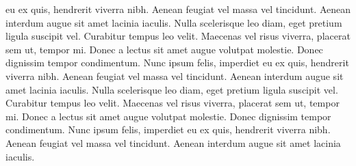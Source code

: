 \documentclass{article}
\begin{document}
eu ex quis, hendrerit viverra nibh. Aenean feugiat vel massa vel tincidunt. Aenean interdum augue sit amet lacinia
iaculis. Nulla scelerisque leo diam, eget pretium ligula suscipit vel. Curabitur tempus leo velit. Maecenas vel
risus viverra, placerat sem ut, tempor mi.
Donec a lectus sit amet augue volutpat molestie. Donec dignissim tempor condimentum. Nunc ipsum felis, imperdiet
eu ex quis, hendrerit viverra nibh. Aenean feugiat vel massa vel tincidunt. Aenean interdum augue sit amet lacinia
iaculis. Nulla scelerisque leo diam, eget pretium ligula suscipit vel. Curabitur tempus leo velit. Maecenas vel
risus viverra, placerat sem ut, tempor mi.
\vspace{5mm}
\newline
Donec a lectus sit amet augue volutpat molestie. Donec dignissim tempor condimentum. Nunc ipsum felis, imperdiet
eu ex quis, hendrerit viverra nibh. Aenean feugiat vel massa vel tincidunt. Aenean interdum augue sit amet
lacinia iaculis.

\end{document}
